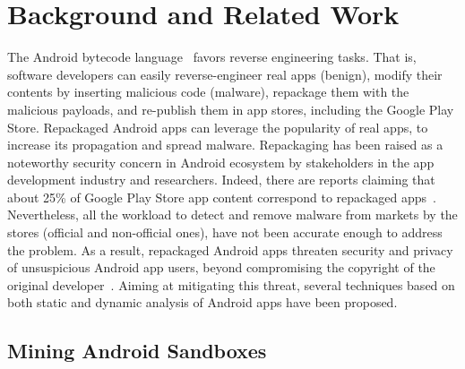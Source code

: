 \section{Background and Related Work}\label{sec:background}


The Android bytecode language~\cite{DBLP:conf/issta/WangGMC15} favors reverse engineering tasks. That is, software developers can easily reverse-engineer real apps (benign), modify their contents by inserting malicious code (malware), repackage them with the malicious payloads, and re-publish them in app stores, including the Google Play Store. Repackaged Android apps can leverage the popularity of real apps, to increase its propagation and spread malware.  
Repackaging has been raised as a noteworthy security concern in Android ecosystem by stakeholders in the app development industry and researchers. Indeed, there are reports claiming that about 25\% of Google Play Store app content correspond to repackaged apps~\cite{DBLP:conf/sigmetrics/ViennotGN14}. Nevertheless, all the workload to detect and remove malware from markets by the stores (official and non-official ones), have not been accurate enough to address the problem. As a result, repackaged Android apps threaten security and privacy of unsuspicious Android app users, beyond compromising the copyright of the original developer~\cite{DBLP:journals/access/KimLCP19}. Aiming at
mitigating this threat, several techniques based on both static and dynamic analysis of Android apps have been proposed.


\subsection{Mining Android Sandboxes}\label{sec:android-sandbox}

